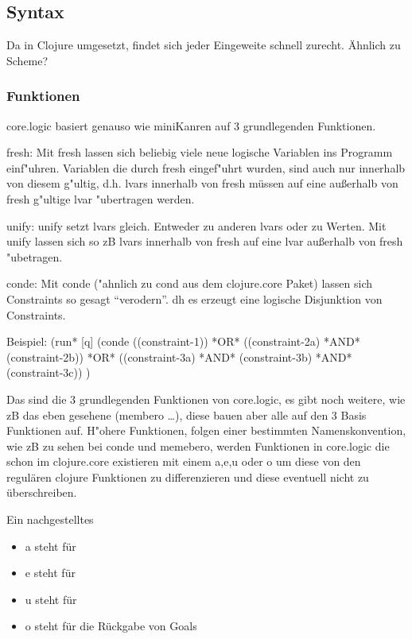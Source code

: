 \subsection{Syntax}

Da in Clojure umgesetzt, findet sich jeder Eingeweite schnell zurecht. Ähnlich zu Scheme?

\subsubsection{Funktionen}
core.logic basiert genauso wie miniKanren auf 3 grundlegenden Funktionen.

fresh:
Mit fresh lassen sich beliebig viele neue logische Variablen ins Programm einf"uhren. Variablen die durch fresh eingef"uhrt wurden, sind auch nur innerhalb von diesem g"ultig, d.h. lvars innerhalb von fresh müssen auf eine außerhalb von fresh g"ultige lvar "ubertragen werden.

unify:
unify setzt lvars gleich. Entweder zu anderen lvars oder zu Werten. Mit unify lassen sich so zB lvars innerhalb von fresh auf eine lvar außerhalb von fresh "ubetragen.

conde:
Mit conde ("ahnlich zu cond aus dem clojure.core Paket) lassen sich Constraints so gesagt “verodern”. dh es erzeugt eine logische Disjunktion von Constraints.

Beispiel:
(run* [q]
    (conde
        ((constraint-1))
            *OR*
        ((constraint-2a) *AND* (constraint-2b))
            *OR*
        ((constraint-3a) *AND* (constraint-3b) *AND* (constraint-3c))
)

Das sind die 3 grundlegenden Funktionen von core.logic, es gibt noch weitere, wie zB das eben gesehene (membero …), diese bauen aber alle auf den 3 Basis Funktionen auf.
H"ohere Funktionen, folgen einer bestimmten Namenskonvention, wie zB zu sehen bei conde und memebero, werden Funktionen in core.logic die schon im clojure.core existieren mit einem a,e,u oder o um diese von den regulären clojure Funktionen zu differenzieren und diese eventuell nicht zu überschreiben.

Ein nachgestelltes 
\begin{itemize}
  \item a steht für 
  
  \item e steht für 
  
  \item u steht für 
  
  \item o steht für die Rückgabe von Goals
\end{itemize}

